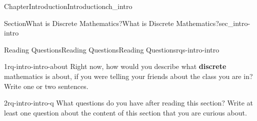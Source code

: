 \documentclass[twoside,11pt,]{book}
\newcommand{\terminology}[1]{\textbf{#1}}
\numberwithin{equation}{chapter}
\begin{document}
\begin{chapterptx}{Chapter}{Introduction}{}{Introduction}{}{}{ch_intro}
\begin{sectionptx}{Section}{What is Discrete Mathematics?}{}{What is Discrete Mathematics?}{}{}{sec_intro-intro}
\begin{reading-questions-subsection-numberless}{Reading Questions}{Reading Questions}{}{Reading Questions}{}{}{rqs-intro-intro}
\begin{introduction}{}
\end{introduction}%
\begin{divisionexercise}{1}{}{}{rq-intro-intro-about}%
Right now, how would you describe what \terminology{discrete} mathematics is about, if you were telling your friends about the class you are in?  Write one or two sentences.%
\end{divisionexercise}%
\begin{divisionexercise}{2}{}{}{rq-intro-intro-q}%
What questions do you have after reading this section?  Write at least one question about the content of this section that you are curious about.%
\end{divisionexercise}%
\end{reading-questions-subsection-numberless}
\end{sectionptx}
\end{chapterptx}
%
%
\typeout{************************************************}
\typeout{************************************************}
%
\end{document}
